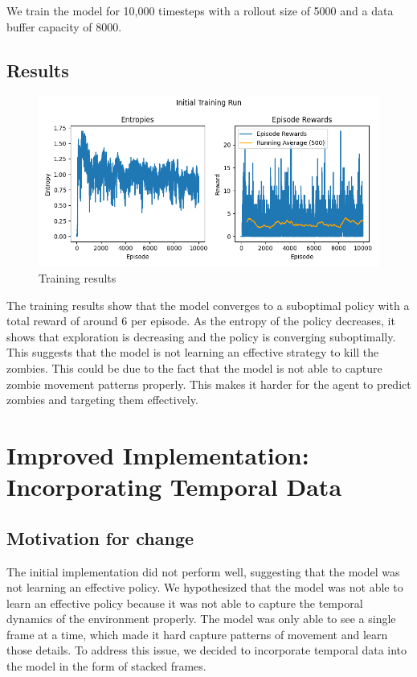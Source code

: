 \documentclass{article}
\begin{document}
We train the model for 10,000 timesteps with a rollout size of 5000 and a data buffer capacity of 8000.


\subsection{Results}

\begin{figure}[h]
  \centering
  \includegraphics[scale=0.7]{metrics_initial.png}
  \caption{Training results}
  \label{fig:training_results_no_temporal}
\end{figure}

The training results show that the model converges to a suboptimal policy with a total reward of around 6 per episode. As the entropy 
of the policy decreases, it shows that exploration is decreasing and the policy is converging suboptimally. This suggests that the model is not learning
an effective strategy to kill the zombies. This could be due to the fact that the model is not able to capture zombie movement patterns properly. This makes it 
harder for the agent to predict zombies and targeting them effectively.

\section{Improved Implementation: Incorporating Temporal Data}
\subsection{Motivation for change}
The initial implementation did not perform well, suggesting that the model was not learning an effective policy. We hypothesized that the model
was not able to learn an effective policy because it was not able to capture the temporal dynamics of the environment properly. The model was only able to see
a single frame at a time, which made it hard capture patterns of movement and learn those details. 
To address this issue, we decided to incorporate temporal data into the model in the form of stacked frames.
\end{document}
